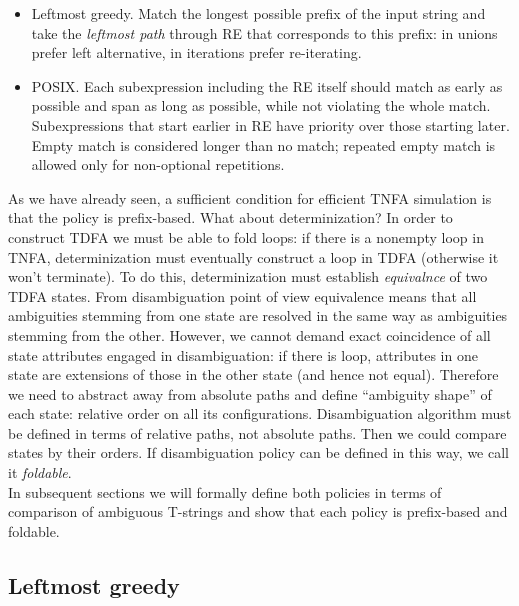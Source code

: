 \documentclass{article}
\theoremstyle{definition}
\begin{document}
\begin{multicols}{2}
\begin{itemize}
    \setlength{\parskip}{0.5em}
    \item Leftmost greedy.
        Match the longest possible prefix of the input string
        and take the \emph{leftmost path} through RE that corresponds to this prefix:
        in unions prefer left alternative, in iterations prefer re-iterating.

    \item POSIX.
        Each subexpression including the RE itself should match as early as possible
        and span as long as possible, while not violating the whole match.
        Subexpressions that start earlier in RE have priority over those starting later.
        Empty match is considered longer than no match;
        repeated empty match is allowed only for non-optional repetitions.
    \\
\end{itemize}

As we have already seen, a sufficient condition for efficient TNFA simulation is that the policy is prefix-based.
What about determinization?
In order to construct TDFA we must be able to fold loops:
if there is a nonempty loop in TNFA, determinization must eventually construct a loop in TDFA
(otherwise it won't terminate).
To do this, determinization must establish \emph{equivalnce} of two TDFA states.
From disambiguation point of view equivalence means that all ambiguities stemming from one state
are resolved in the same way as ambiguities stemming from the other.
However, we cannot demand exact coincidence of all state attributes engaged in disambiguation:
if there is loop, attributes in one state are extensions of those in the other state (and hence not equal).
Therefore we need to abstract away from absolute paths and define ``ambiguity shape'' of each state: relative order on all its configurations.
Disambiguation algorithm must be defined in terms of relative paths, not absolute paths.
Then we could compare states by their orders.
If disambiguation policy can be defined in this way, we call it \emph{foldable}.
\\

In subsequent sections we will formally define both policies in terms of comparison of ambiguous T-strings
and show that each policy is prefix-based and foldable.

\subsection*{Leftmost greedy}


\end{multicols}
\end{document}
